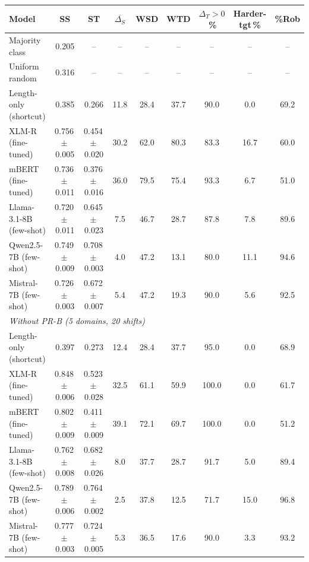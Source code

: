 \begin{tabular}{lcccccccc}
\toprule
Model & SS & ST & $\overline{\Delta_S}$ & WSD & WTD & $\Delta_T{>}0$\,\% & Harder-tgt\,\% & \%Rob \\
\midrule
Majority class & 0.205 & -- & -- & -- & -- & -- & -- & -- \\
Uniform random & 0.316 & -- & -- & -- & -- & -- & -- & -- \\
Length-only (shortcut) & 0.385 & 0.266 & 11.8 & 28.4 & 37.7 & 90.0 & 0.0 & 69.2 \\
\midrule
XLM-R (fine-tuned) & 0.756\,$\pm$\,0.005 & 0.454\,$\pm$\,0.020 & 30.2 & 62.0 & 80.3 & 83.3 & 16.7 & 60.0 \\
mBERT (fine-tuned) & 0.736\,$\pm$\,0.011 & 0.376\,$\pm$\,0.016 & 36.0 & 79.5 & 75.4 & 93.3 & 6.7 & 51.0 \\
\midrule
Llama-3.1-8B (few-shot) & 0.720\,$\pm$\,0.011 & 0.645\,$\pm$\,0.023 & 7.5 & 46.7 & 28.7 & 87.8 & 7.8 & 89.6 \\
Qwen2.5-7B (few-shot) & 0.749\,$\pm$\,0.009 & 0.708\,$\pm$\,0.003 & 4.0 & 47.2 & 13.1 & 80.0 & 11.1 & 94.6 \\
Mistral-7B (few-shot) & 0.726\,$\pm$\,0.003 & 0.672\,$\pm$\,0.007 & 5.4 & 47.2 & 19.3 & 90.0 & 5.6 & 92.5 \\
\midrule
\multicolumn{9}{l}{\textit{Without PR-B (5 domains, 20 shifts)}} \\
\midrule
Length-only (shortcut) & 0.397 & 0.273 & 12.4 & 28.4 & 37.7 & 95.0 & 0.0 & 68.9 \\
\midrule
XLM-R (fine-tuned) & 0.848\,$\pm$\,0.006 & 0.523\,$\pm$\,0.028 & 32.5 & 61.1 & 59.9 & 100.0 & 0.0 & 61.7 \\
mBERT (fine-tuned) & 0.802\,$\pm$\,0.009 & 0.411\,$\pm$\,0.009 & 39.1 & 72.1 & 69.7 & 100.0 & 0.0 & 51.2 \\
\midrule
Llama-3.1-8B (few-shot) & 0.762\,$\pm$\,0.008 & 0.682\,$\pm$\,0.026 & 8.0 & 37.7 & 28.7 & 91.7 & 5.0 & 89.4 \\
Qwen2.5-7B (few-shot) & 0.789\,$\pm$\,0.006 & 0.764\,$\pm$\,0.002 & 2.5 & 37.8 & 12.5 & 71.7 & 15.0 & 96.8 \\
Mistral-7B (few-shot) & 0.777\,$\pm$\,0.003 & 0.724\,$\pm$\,0.005 & 5.3 & 36.5 & 17.6 & 90.0 & 3.3 & 93.2 \\
\bottomrule
\end{tabular}

